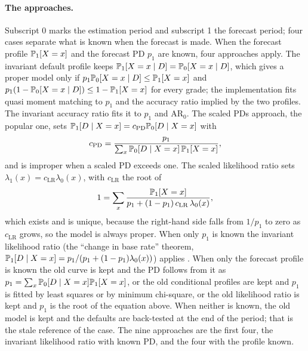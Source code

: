 \paragraph{The approaches.} Subscript 0 marks the estimation period and subscript 1 the forecast period; four cases separate what is known when the forecast is made. When the forecast profile $\mathbb{P}_1[X=x]$ and the forecast PD $p_1$ are known, four approaches apply. The invariant default profile keeps $\mathbb{P}_1[X=x\mid D]=\mathbb{P}_0[X=x\mid D]$, which gives a proper model only if $p_1\mathbb{P}_0[X=x\mid D]\le\mathbb{P}_1[X=x]$ and $p_1(1-\mathbb{P}_0[X=x\mid D])\le1-\mathbb{P}_1[X=x]$ for every grade; the implementation fits quasi moment matching to $p_1$ and the accuracy ratio implied by the two profiles. The invariant accuracy ratio fits it to $p_1$ and $\mathrm{AR}_0$. The scaled PDs approach, the popular one, sets $\mathbb{P}_1[D\mid X=x]=c_{\mathrm{PD}}\mathbb{P}_0[D\mid X=x]$ with
\begin{equation}
c_{\mathrm{PD}}=\frac{p_1}{\sum_x\mathbb{P}_0[D\mid X=x]\,\mathbb{P}_1[X=x]},
\label{eq:ratings-cpd}
\end{equation}
and is improper when a scaled PD exceeds one. The scaled likelihood ratio sets $\lambda_1(x)=c_{\mathrm{LR}}\lambda_0(x)$, with $c_{\mathrm{LR}}$ the root of
\begin{equation}
1=\sum_x\frac{\mathbb{P}_1[X=x]}{p_1+(1-p_1)\,c_{\mathrm{LR}}\,\lambda_0(x)},
\label{eq:ratings-clr}
\end{equation}
which exists and is unique, because the right-hand side falls from $1/p_1$ to zero as $c_{\mathrm{LR}}$ grows, so the model is always proper. When only $p_1$ is known the invariant likelihood ratio (the ``change in base rate'' theorem, $\mathbb{P}_1[D\mid X=x]=p_1/(p_1+(1-p_1)\lambda_0(x))$) applies \citep{ratings:elkan2001}. When only the forecast profile is known the old curve is kept and the PD follows from it as $p_1=\sum_x\mathbb{P}_0[D\mid X=x]\mathbb{P}_1[X=x]$, or the old conditional profiles are kept and $p_1$ is fitted by least squares or by minimum chi-square, or the old likelihood ratio is kept and $p_1$ is the root of the equation above. When neither is known, the old model is kept and the defaults are back-tested at the end of the period; that is the stale reference of the case. The nine approaches are the first four, the invariant likelihood ratio with known PD, and the four with the profile known.

